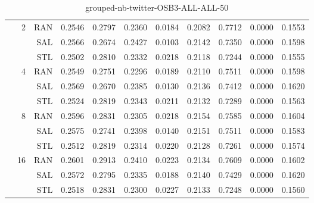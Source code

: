 \begin{center}
\begin{table}[htbp]
\begin{tabular}{ | r | r | r | r | r | r | r | r | r | r | r |}
 & \multirow{3}{*}{2} & RAN & 0.2546 & 0.2797 & 0.2360 & 0.0184 & 0.2082 & 0.7712 & 0.0000 & 0.1553\\ \cline{3-11}
 &   & SAL & 0.2566 & 0.2674 & 0.2427 & 0.0103 & 0.2142 & 0.7350 & 0.0000 & 0.1598\\ \cline{3-11}
 &   & STL & 0.2502 & 0.2810 & 0.2332 & 0.0218 & 0.2118 & 0.7244 & 0.0000 & 0.1555\\ \cline{2-11}
 & \multirow{3}{*}{4} & RAN & 0.2549 & 0.2751 & 0.2296 & 0.0189 & 0.2110 & 0.7511 & 0.0000 & 0.1598\\ \cline{3-11}
 &   & SAL & 0.2569 & 0.2670 & 0.2385 & 0.0130 & 0.2136 & 0.7412 & 0.0000 & 0.1620\\ \cline{3-11}
 &   & STL & 0.2524 & 0.2819 & 0.2343 & 0.0211 & 0.2132 & 0.7289 & 0.0000 & 0.1563\\ \cline{2-11}
 & \multirow{3}{*}{8} & RAN & 0.2596 & 0.2831 & 0.2305 & 0.0218 & 0.2154 & 0.7585 & 0.0000 & 0.1604\\ \cline{3-11}
 &   & SAL & 0.2575 & 0.2741 & 0.2398 & 0.0140 & 0.2151 & 0.7511 & 0.0000 & 0.1583\\ \cline{3-11}
 &   & STL & 0.2512 & 0.2819 & 0.2314 & 0.0220 & 0.2128 & 0.7261 & 0.0000 & 0.1574\\ \cline{2-11}
 & \multirow{3}{*}{16} & RAN & 0.2601 & 0.2913 & 0.2410 & 0.0223 & 0.2134 & 0.7609 & 0.0000 & 0.1602\\ \cline{3-11}
 &   & SAL & 0.2572 & 0.2795 & 0.2335 & 0.0188 & 0.2140 & 0.7429 & 0.0000 & 0.1620\\ \cline{3-11}
 &   & STL & 0.2518 & 0.2831 & 0.2300 & 0.0227 & 0.2133 & 0.7248 & 0.0000 & 0.1560\\ \cline{2-11}
\hline
\end{tabular}
\caption{grouped-nb-twitter-OSB3-ALL-ALL-50}
\end{table}
\end{center}

